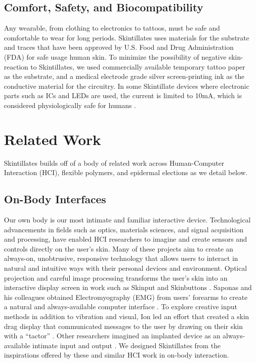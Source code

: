 \documentclass{sigchi}
\begin{document}
\subsection{Comfort, Safety, and Biocompatibility}
Any wearable, from clothing to electronics to tattoos, must be safe and comfortable to wear for long periods.  Skintillates uses materials for the substrate and traces that have been approved by U.S. Food and Drug Administration (FDA) for safe usage human skin. To minimize the possibility of negative skin-reaction to Skintillates, we used commercially available temporary tattoo paper as the substrate, and a medical electrode grade silver screen-printing ink as the conductive material for the circuitry\cite{Anonymous:6vWXbuD5,Cristea:2009uq,Rattfalt:2013ts}. In some Skintillate devices where electronic parts such as ICs and LEDs are used, the current is limited to 10mA, which is considered physiologically safe for humans \cite{Scherz:_BfVY1Mg}. 

\section{Related Work}
Skintillates builds off of a body of related work across Human-Computer Interaction (HCI), flexible polymers, and epidermal elections as we detail below.
\subsection{On-Body Interfaces}
Our own body is our most intimate and familiar interactive device. Technological advancements in fields such as optics, materials sciences, and signal acquisition and processing, have enabled HCI researchers to imagine and create sensors and controls directly on the user’s skin. Many of these projects aim to create an always-on, unobtrusive, responsive technology that allows users to interact in natural and intuitive ways with their personal devices and environment. Optical projection and careful image processing transforms the user’s skin into an interactive display  screen  in  work  such   as   Skinput   and Skinbuttons \cite{ChrisHarrison:2010vi, Laput:2014du}. Saponas and his colleagues obtained Electromyography (EMG) from users’ forearms to create a natural and always-available computer interface \cite{Anonymous:2009ua}. To explore creative input methods in addition to vibration and visual, Ion led an effort that created a skin drag display that communicated messages to the user by drawing  on their skin with a ``tactor'' \cite{Ion:2015ig}. Other researchers imagined an implanted device as an always-available intimate input and output \cite{Holz:2012ti}. We designed Skintillates from the inspirations offered by these and similar HCI work in on-body interaction.
\end{document}
